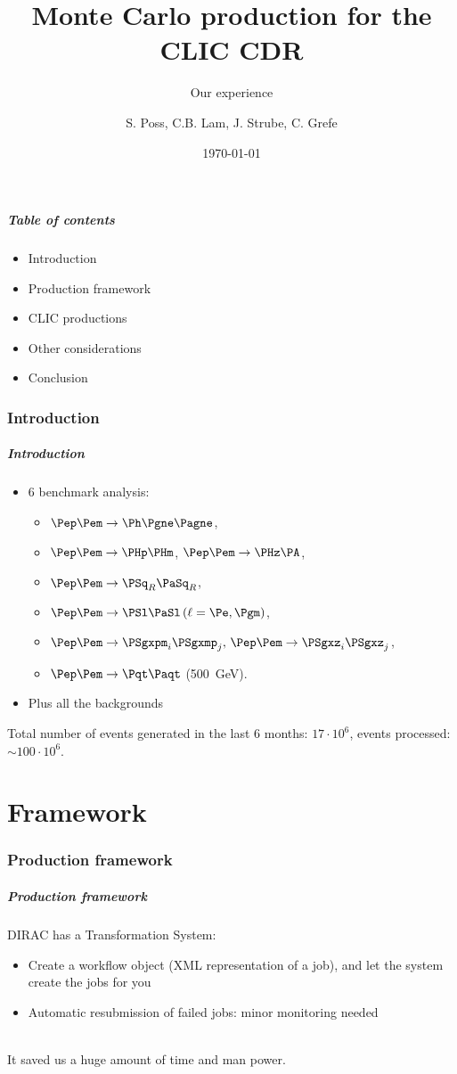 \documentclass{beamer}
\author{S. Poss, C.B. Lam, J. Strube, C. Grefe}
\institute[CERN]{CERN}
\title[]{Monte Carlo production for the CLIC CDR}
\subtitle{Our experience}
\date{\today}
\begin{document}
\begin{frame}
	\titlepage
\end{frame}

\begin{frame}
	\frametitle{Table of contents}
	\begin{itemize}
\item Introduction
\item Production framework
\item CLIC productions
\item Other considerations
\item Conclusion
\end{itemize}
\end{frame}

\section{Introduction}

\begin{frame}
	\frametitle{Introduction}
\begin{itemize}
\item 6 benchmark analysis: 
\begin{itemize}
\item $\Pep\Pem \to \Ph \Pgne \Pagne$,
\item  $\Pep\Pem \to \PHp \PHm$, $\Pep\Pem \to \PHz \PA$, 
\item $\Pep\Pem \to \PSq_R \PaSq_R$, 
\item $\Pep\Pem \to \PSl \PaSl \,(\ell = \Pe,\Pgm)$, 
\item $\Pep\Pem \to \PSgxpm_i \PSgxmp_j,\, \Pep\Pem \to \PSgxz_i \PSgxz_j$,
\item  $\Pep\Pem \to \Pqt \Paqt$ (500~GeV).
\end{itemize}
\item Plus all the backgrounds
\end{itemize}
Total number of events generated in the last 6 months: \alert{$17\cdot 10^6$}, events processed: $\sim 100\cdot 10^6$.
\end{frame}

\part{Framework}
\begin{frame}
\partpage 
\end{frame}

\section{Production framework}
\begin{frame}
	\frametitle{Production framework}
DIRAC has a Transformation System:
\begin{itemize}
\item  Create a workflow object (XML representation of a job), and let the system create the jobs for you
\item Automatic resubmission of failed jobs: minor monitoring needed
\end{itemize}
~\\
It \alert{saved us a huge amount of time and man power}.
\end{frame}
\end{document}
